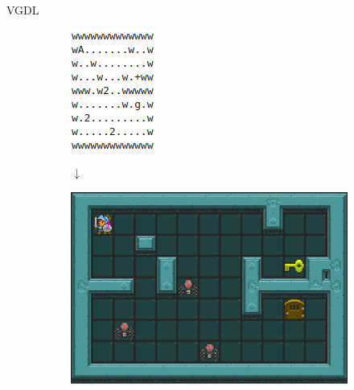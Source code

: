 \documentclass[11pt]{beamer}    %
\begin{document}
    \begin{frame}{VGDL}
        \begin{figure}
            \centering
            \begin{subfigure}{0.5\textwidth}
                \centering
                \includegraphics[scale=0.5]{img/presentation/game_lvl}
                \par\bigskip
                {\LARGE$\downarrow{}$}
                \par\bigskip
                \includegraphics[scale=0.2]{img/presentation/zelda}
            \end{subfigure}%
            \begin{subfigure}{0.5\textwidth}
                \centering

\end{subfigure}
\end{figure}
\end{frame}
\end{document}
